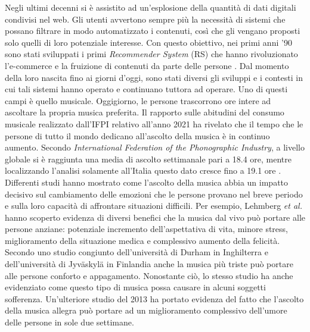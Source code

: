\documentclass[11pt]{report}
\begin{document}
Negli ultimi decenni si è assistito ad un'esplosione della quantità di dati digitali condivisi nel web. Gli utenti avvertono sempre più la necessità di sistemi che possano filtrare in modo automatizzato i contenuti, così che gli vengano proposti solo quelli di loro potenziale interesse. Con questo obiettivo, nei primi anni '90 sono stati sviluppati i primi \textit{Recommender System} (RS) che hanno rivoluzionato l'e-commerce e la fruizione di contenuti da parte delle persone \cite{Konstan2012Apr}. Dal momento della loro nascita fino ai giorni d'oggi, sono stati diversi gli sviluppi e i contesti in cui tali sistemi hanno operato e continuano tuttora ad operare. Uno di questi campi è quello musicale. 
Oggigiorno, le persone trascorrono ore intere ad ascoltare la propria musica preferita. Il rapporto sulle abitudini del consumo musicale realizzato dall'IFPI relativo all'anno 2021 ha rivelato che il tempo che le persone di tutto il mondo dedicano all'ascolto della musica è in continuo aumento. Secondo \emph{International Federation of the Phonographic Industry}, a livello globale si è raggiunta una media di ascolto settimanale pari a 18.4 ore, mentre localizzando l'analisi solamente all'Italia questo dato cresce fino a 19.1 ore \cite{BibEntry2022Feb}. Differenti studi hanno mostrato come l'ascolto della musica abbia un impatto decisivo sul cambiamento delle emozioni che le persone provano nel breve periodo e sulla loro capacità di affrontare situazioni difficili. Per esempio, Lehmberg \textit{et al.}\cite{Lehmberg2010BenefitsOM} hanno scoperto evidenza di diversi benefici che la musica dal vivo può portare alle persone anziane: potenziale incremento dell'aspettativa di vita, minore stress, miglioramento della situazione medica e complessivo aumento della felicità. Secondo uno studio congiunto dell'università di Durham in Inghilterra e dell'università di Jyväskylä in Finlandia \cite{Eerola2016Jun} anche la musica più triste può portare alle persone conforto e appagamento. Nonostante ciò, lo stesso studio ha anche evidenziato come questo tipo di musica possa causare in alcuni soggetti sofferenza. 
Un'ulteriore studio del 2013 \cite{Ferguson2013Jan} ha portato evidenza del fatto che l'ascolto della musica allegra può portare ad un miglioramento complessivo dell'umore delle persone in sole due settimane.\\
\end{document}
